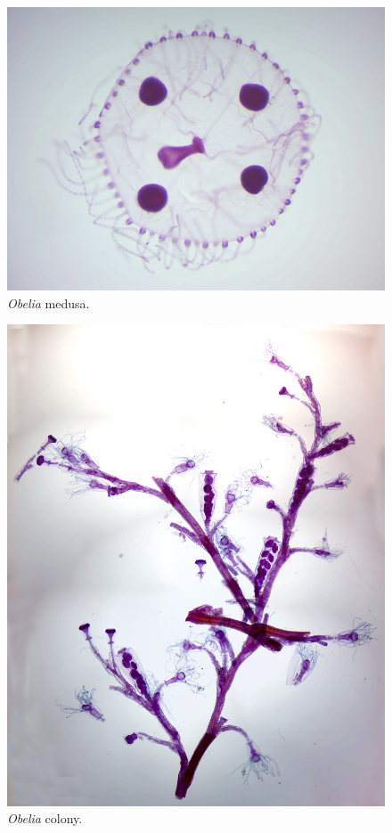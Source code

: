 \begin{figure}

{\centering \includegraphics[width=0.7\linewidth]{./figures/porifera/obelia_medusa}

}

\caption{\emph{Obelia} medusa.}\label{fig:obeliamedusa}
\end{figure}



\begin{figure}

{\centering \includegraphics[width=0.7\linewidth]{./figures/porifera/obelia_wm}

}

\caption{\emph{Obelia} colony.}\label{fig:obeliacolony}
\end{figure}

